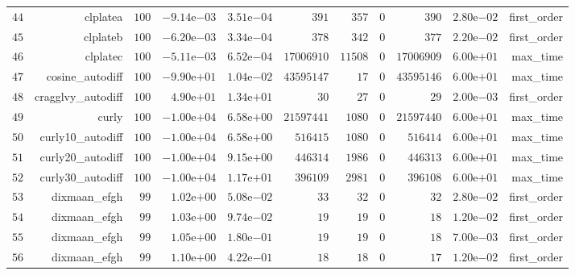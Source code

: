 \documentclass[varwidth=20cm,crop=true]{standalone}
\begin{document}
\begin{longtable}{rrrrrrrrrrr}
  \(    44\) & clplatea & \(   100\) & \(-9.14\)e\(-03\) & \( 3.51\)e\(-04\) & \(   391\) & \(   357\) & \(     0\) & \(   390\) & \( 2.80\)e\(-02\) & first\_order \\
  \(    45\) & clplateb & \(   100\) & \(-6.20\)e\(-03\) & \( 3.34\)e\(-04\) & \(   378\) & \(   342\) & \(     0\) & \(   377\) & \( 2.20\)e\(-02\) & first\_order \\
  \(    46\) & clplatec & \(   100\) & \(-5.11\)e\(-03\) & \( 6.52\)e\(-04\) & \(17006910\) & \( 11508\) & \(     0\) & \(17006909\) & \( 6.00\)e\(+01\) & max\_time \\
  \(    47\) & cosine\_autodiff & \(   100\) & \(-9.90\)e\(+01\) & \( 1.04\)e\(-02\) & \(43595147\) & \(    17\) & \(     0\) & \(43595146\) & \( 6.00\)e\(+01\) & max\_time \\
  \(    48\) & cragglvy\_autodiff & \(   100\) & \( 4.90\)e\(+01\) & \( 1.34\)e\(+01\) & \(    30\) & \(    27\) & \(     0\) & \(    29\) & \( 2.00\)e\(-03\) & first\_order \\
  \(    49\) & curly & \(   100\) & \(-1.00\)e\(+04\) & \( 6.58\)e\(+00\) & \(21597441\) & \(  1080\) & \(     0\) & \(21597440\) & \( 6.00\)e\(+01\) & max\_time \\
  \(    50\) & curly10\_autodiff & \(   100\) & \(-1.00\)e\(+04\) & \( 6.58\)e\(+00\) & \(516415\) & \(  1080\) & \(     0\) & \(516414\) & \( 6.00\)e\(+01\) & max\_time \\
  \(    51\) & curly20\_autodiff & \(   100\) & \(-1.00\)e\(+04\) & \( 9.15\)e\(+00\) & \(446314\) & \(  1986\) & \(     0\) & \(446313\) & \( 6.00\)e\(+01\) & max\_time \\
  \(    52\) & curly30\_autodiff & \(   100\) & \(-1.00\)e\(+04\) & \( 1.17\)e\(+01\) & \(396109\) & \(  2981\) & \(     0\) & \(396108\) & \( 6.00\)e\(+01\) & max\_time \\
  \(    53\) & dixmaan\_efgh & \(    99\) & \( 1.02\)e\(+00\) & \( 5.08\)e\(-02\) & \(    33\) & \(    32\) & \(     0\) & \(    32\) & \( 2.80\)e\(-02\) & first\_order \\
  \(    54\) & dixmaan\_efgh & \(    99\) & \( 1.03\)e\(+00\) & \( 9.74\)e\(-02\) & \(    19\) & \(    19\) & \(     0\) & \(    18\) & \( 1.20\)e\(-02\) & first\_order \\
  \(    55\) & dixmaan\_efgh & \(    99\) & \( 1.05\)e\(+00\) & \( 1.80\)e\(-01\) & \(    19\) & \(    19\) & \(     0\) & \(    18\) & \( 7.00\)e\(-03\) & first\_order \\
  \(    56\) & dixmaan\_efgh & \(    99\) & \( 1.10\)e\(+00\) & \( 4.22\)e\(-01\) & \(    18\) & \(    18\) & \(     0\) & \(    17\) & \( 1.20\)e\(-02\) & first\_order \\

\end{longtable}
\end{document}

